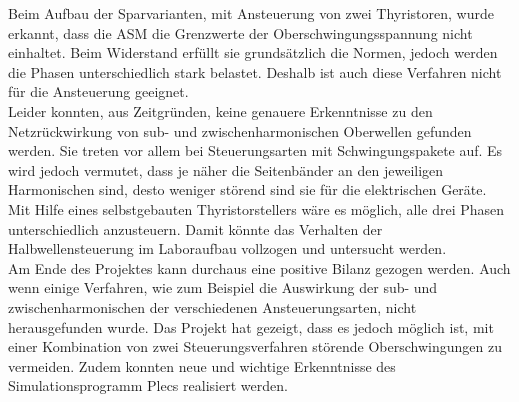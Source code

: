 Beim Aufbau der Sparvarianten, mit Ansteuerung von zwei Thyristoren, wurde erkannt, dass die ASM die Grenzwerte der Oberschwingungsspannung nicht einhaltet. Beim Widerstand erfüllt sie grundsätzlich die Normen, jedoch werden die Phasen unterschiedlich stark belastet. Deshalb ist auch diese Verfahren nicht für die Ansteuerung geeignet.\\
Leider konnten, aus Zeitgründen, keine genauere Erkenntnisse zu den Netzrückwirkung von sub- und zwischenharmonischen Oberwellen gefunden werden. Sie treten vor allem bei Steuerungsarten mit Schwingungspakete auf. Es wird jedoch vermutet, dass je näher die Seitenbänder an den jeweiligen Harmonischen sind, desto weniger störend sind sie für die elektrischen Geräte.\\
Mit Hilfe eines selbstgebauten Thyristorstellers wäre es möglich, alle drei Phasen unterschiedlich anzusteuern. Damit könnte das Verhalten der Halbwellensteuerung im Laboraufbau vollzogen und untersucht werden.\\
Am Ende des Projektes kann durchaus eine positive Bilanz gezogen werden. Auch wenn einige Verfahren, wie zum Beispiel die Auswirkung der sub- und zwischenharmonischen der verschiedenen Ansteuerungsarten, nicht herausgefunden wurde. Das Projekt hat gezeigt, dass es jedoch möglich ist, mit einer Kombination von zwei Steuerungsverfahren störende Oberschwingungen zu vermeiden. Zudem konnten neue und wichtige Erkenntnisse des Simulationsprogramm Plecs realisiert werden.  





